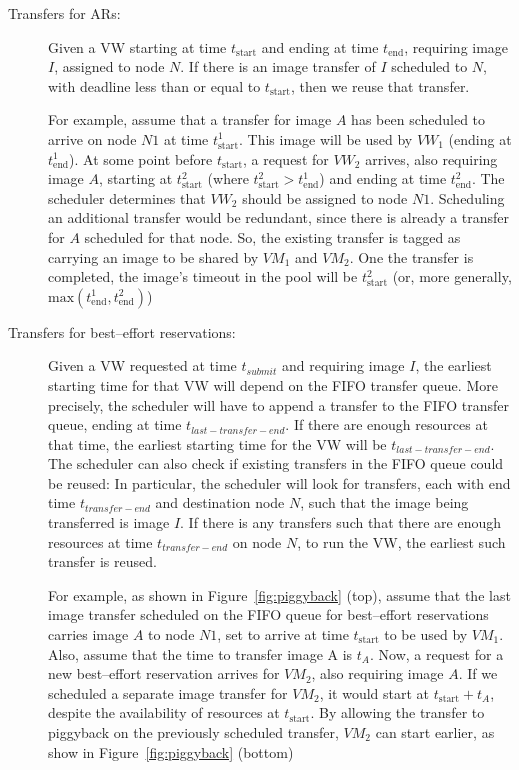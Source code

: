 \begin{description}
\item[Transfers for ARs:] Given a VW starting at time $t_\textrm{start}$ and ending at time $t_\textrm{end}$, requiring image $I$, assigned to node $N$. If there is an image transfer of $I$ scheduled to $N$, with deadline less than or equal to $t_\textrm{start}$, then we reuse that transfer. 

For example, assume that a transfer for image $A$ has been scheduled to arrive on node $N1$ at time $t^1_\textrm{start}$. This image will be used by $VW_1$ (ending at $t^1_\textrm{end}$). At some point before $t_\textrm{start}$, a request for $VW_2$ arrives, also requiring image $A$, starting at $t^2_\textrm{start}$ (where $t^2_\textrm{start}>t^1_\textrm{end}$) and ending at time $t^2_\textrm{end}$. The scheduler determines that $VW_2$ should be assigned to node $N1$. Scheduling an additional transfer would be redundant, since there is already a transfer for $A$ scheduled for that node. So, the existing transfer is tagged as carrying an image to be shared by $VM_1$ and $VM_2$. One the transfer is completed, the image's timeout in the pool will be $t^2_\textrm{start}$ (or, more generally, $\textrm{max}(t^1_\textrm{end},t^2_\textrm{end})$)

\item[Transfers for best--effort reservations:] Given a VW requested at time $t_{submit}$ and requiring image $I$, the earliest starting time for that VW will depend on the FIFO transfer queue. More precisely, the scheduler will have to append a transfer to the FIFO transfer queue, ending at time $t_{last-transfer-end}$. If there are enough resources at that time, the earliest starting time for the VW will be $t_{last-transfer-end}$. The scheduler can also check if existing transfers in the FIFO queue could be reused: In particular, the scheduler will look for transfers, each with end time $t_{transfer-end}$ and destination node $N$, such that the image being transferred is image $I$. If there is any transfers such that there are enough resources at time $t_{transfer-end}$ on node $N$, to run the VW, the earliest such transfer is reused.

For example, as shown in Figure~\ref{fig:piggyback} (top), assume that the last image transfer scheduled on the FIFO queue for best--effort reservations carries image $A$ to node $N1$, set to arrive at time $t_\textrm{start}$ to be used by $VM_1$. Also, assume that the time to transfer image A is $t_A$. Now, a request for a new best--effort reservation arrives for $VM_2$, also requiring image $A$. If we scheduled a separate image transfer for $VM_2$, it would start at $t_\textrm{start}+t_A$, despite the availability of resources at $t_\textrm{start}$. By allowing the transfer to piggyback on the previously scheduled transfer, $VM_2$ can start earlier, as show in Figure~\ref{fig:piggyback} (bottom)
\end{description}


